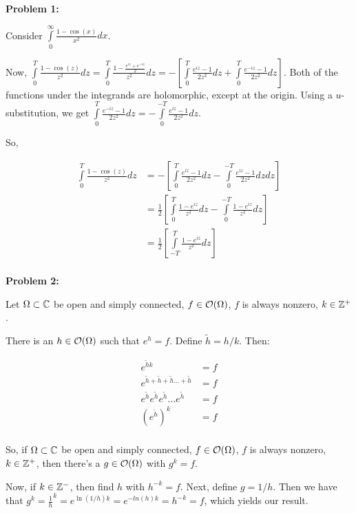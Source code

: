 \documentclass[a4paper,12pt]{article}
\begin{document}
{\bf Problem 1:}

Consider $\int\limits_0^\infty \frac{1-\cos(x)}{x^2} dx$. 

Now, $\int\limits_0^T\frac{1-\cos(z)}{z^2} dz = \int\limits_0^T\frac{1-\frac{e^{iz}+e^{-iz}}{2}}{z^2} dz = -\left[\int\limits_0^T \frac{e^{iz}-1}{2z^2} dz+ \int\limits_0^T \frac{e^{-iz}-1}{2z^2} dz\right]$. Both of the functions under the integrands are holomorphic, except at the origin. Using a $u$-substitution, we get $\int\limits_0^T \frac{e^{-iz}-1}{2z^2} dz = -\int\limits_0^{-T} \frac{e^{iz}-1}{2z^2} dz$.

So, 

\begin{align*}
\int\limits_0^T\frac{1-\cos(z)}{z^2} dz &= -\left[\int\limits_0^T \frac{e^{iz}-1}{2z^2} dz- \int\limits_0^{-T} \frac{e^{iz}-1}{2z^2} dz dz\right]\\
&= \frac{1}{2}\left[\int\limits_0^T \frac{1-e^{iz}}{z^2} dz-\int\limits_0^{-T} \frac{1-e^{iz}}{z^2} dz \right]\\
&= \frac{1}{2}\left[\int\limits_{-T}^T \frac{1-e^{iz}}{z^2} dz \right]\\
\end{align*} %

\shunt

{\bf Problem 2:}

Let $\Omega \subset \mathbb{C}$ be open and simply connected, $f \in \mathcal{O} (\Omega)$, $f$ is always nonzero, $k \in \mathbb{Z}^+$.

There is an $h \in \mathcal{O}(\Omega)$ such that $e^h =f$. Define $\tilde{h} = h/k$. Then:

\begin{align*}
e^{\tilde{h}k} &= f\\
e^{\tilde{h}+\tilde{h}+\tilde{h} \ldots +\tilde{h}} &= f\\
e^{\tilde{h}}e^{\tilde{h}}e^{\tilde{h}} \ldots e^{\tilde{h}} &= f\\
(e^{\tilde{h}})^k &= f\\
\end{align*}

So, if $\Omega \subset \mathbb{C}$ be open and simply connected, $f \in \mathcal{O} (\Omega)$, $f$ is always nonzero, $k \in \mathbb{Z}^+$, then there's a $g \in \mathcal{O}(\Omega)$ with $g^k = f$.

Now, if $k \in \mathbb{Z}^-$, then find $h$ with $h^{-k} = f$. Next, define $g = 1/h$. Then we have that $g^k = \frac{1}{h}^k =e^{\ln(1/h)k} = e^{-ln(h)k}= h^{-k} = f$, which yields our result. %
\end{document}
